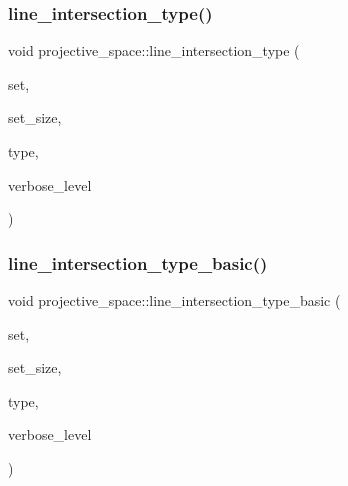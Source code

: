 \subsubsection{\texorpdfstring{line\+\_\+intersection\+\_\+type()}{line\_intersection\_type()}}
{\footnotesize\ttfamily void projective\+\_\+space\+::line\+\_\+intersection\+\_\+type (\begin{DoxyParamCaption}\item[{\mbox{\hyperlink{galois_8h_a09fddde158a3a20bd2dcadb609de11dc}{I\+NT}} $\ast$}]{set,  }\item[{\mbox{\hyperlink{galois_8h_a09fddde158a3a20bd2dcadb609de11dc}{I\+NT}}}]{set\+\_\+size,  }\item[{\mbox{\hyperlink{galois_8h_a09fddde158a3a20bd2dcadb609de11dc}{I\+NT}} $\ast$}]{type,  }\item[{\mbox{\hyperlink{galois_8h_a09fddde158a3a20bd2dcadb609de11dc}{I\+NT}}}]{verbose\+\_\+level }\end{DoxyParamCaption})}

\mbox{\label{classprojective__space_ad9a11792e1a91a598976cf41ebdd8bd3}} 
\subsubsection{\texorpdfstring{line\+\_\+intersection\+\_\+type\+\_\+basic()}{line\_intersection\_type\_basic()}}
{\footnotesize\ttfamily void projective\+\_\+space\+::line\+\_\+intersection\+\_\+type\+\_\+basic (\begin{DoxyParamCaption}\item[{\mbox{\hyperlink{galois_8h_a09fddde158a3a20bd2dcadb609de11dc}{I\+NT}} $\ast$}]{set,  }\item[{\mbox{\hyperlink{galois_8h_a09fddde158a3a20bd2dcadb609de11dc}{I\+NT}}}]{set\+\_\+size,  }\item[{\mbox{\hyperlink{galois_8h_a09fddde158a3a20bd2dcadb609de11dc}{I\+NT}} $\ast$}]{type,  }\item[{\mbox{\hyperlink{galois_8h_a09fddde158a3a20bd2dcadb609de11dc}{I\+NT}}}]{verbose\+\_\+level }\end{DoxyParamCaption})}

\mbox{\label{classprojective__space_a398b73262a1b45e1e8e786afea64a7ec}} 
